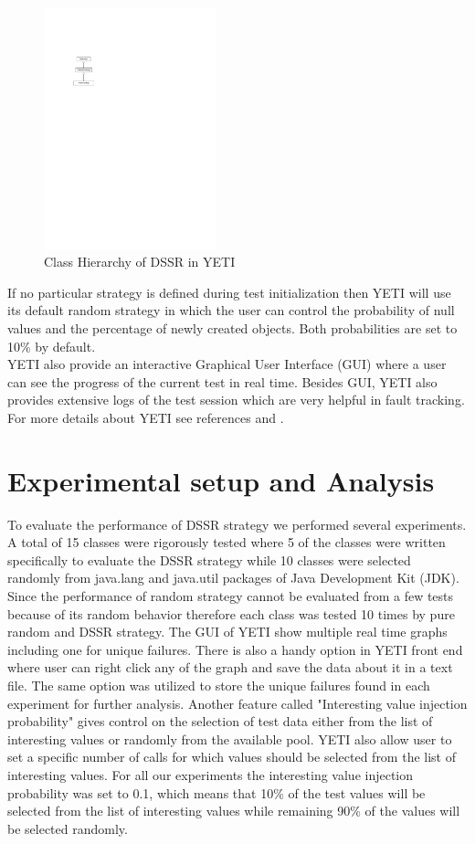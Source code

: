 \documentclass[10pt, conference, compsocconf]{IEEEtran}
\begin{document}
\begin{figure}[htp]
\centering
\includegraphics[width=5cm,height=7cm]{hierarchy.pdf}
\caption{Class Hierarchy of DSSR in YETI}
\label{fig:hierarchyofDSSR}
\end{figure}


If no particular strategy is defined during test initialization then YETI will use its default random strategy in which the user can control the probability of null values and the percentage of newly created objects. Both probabilities are set to 10\% by default. \\

YETI also provide an interactive Graphical User Interface (GUI) where a user can see the progress of the current test in real time. Besides GUI, YETI also provides extensive logs of the test session which are very helpful in fault tracking. For more details about YETI see references \cite{Oriol2010a} and \cite{Oriol2010}.

\section{Experimental setup and Analysis}
To evaluate the performance of DSSR strategy we performed several experiments. A total of 15 classes were rigorously tested where 5 of the classes were written specifically to evaluate the DSSR strategy while 10 classes were selected randomly from java.lang and java.util packages of Java Development Kit (JDK). Since the performance of random strategy cannot be evaluated from a few tests because of its random behavior therefore each class was tested 10 times by pure random and DSSR strategy. The GUI of YETI show multiple real time graphs including one for unique failures. There is also a handy option in YETI front end where user can right click any of the graph and save the data about it in a text file. The same option was utilized to store the unique failures found in each experiment for further analysis. Another feature called "Interesting value injection probability" gives control on the selection of test data either from the list of interesting values or randomly from the available pool. YETI also allow user to set a specific number of calls for which values should be selected from the list of interesting values. For all our experiments the interesting value injection probability was set to 0.1, which means that 10\% of the test values will be selected from the list of interesting values while remaining 90\% of the values will be selected randomly.\\
\end{document}
